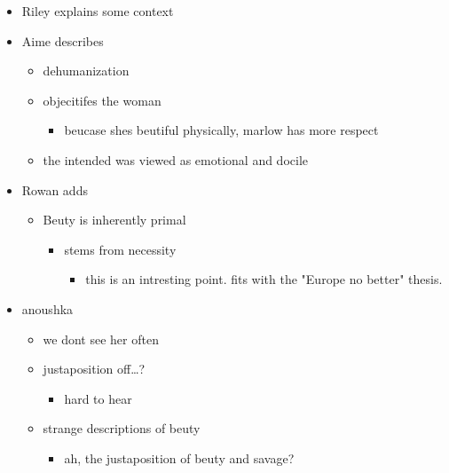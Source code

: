 \documentclass[letterpaper]{article}
\begin{document}
\begin{itemize}
\item Riley explains some context
\item Aime describes

\begin{itemize}
\item dehumanization
\item objecitifes the woman

\begin{itemize}
\item beucase shes beutiful physically, marlow has more respect
\end{itemize}

\item the intended was viewed as emotional and docile
\end{itemize}

\item Rowan adds

\begin{itemize}
\item Beuty is inherently primal

\begin{itemize}
\item stems from necessity

\begin{itemize}
\item this is an intresting point. fits with the "Europe no better"
thesis.
\end{itemize}
\end{itemize}
\end{itemize}

\item anoushka

\begin{itemize}
\item we dont see her often
\item justaposition off\ldots{}?

\begin{itemize}
\item hard to hear
\end{itemize}

\item strange descriptions of beuty

\begin{itemize}
\item ah, the justaposition of beuty and savage?
\end{itemize}
\end{itemize}


\end{itemize}
\end{document}
